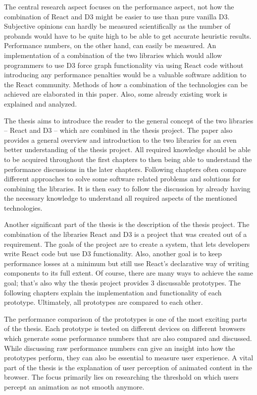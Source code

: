 The central research aspect focuses on the performance aspect, not how the combination of React and D3 might be easier to use than pure vanilla D3. Subjective opinions can hardly be measured scientifically as the number of probands would have to be quite high to be able to get accurate heuristic results. Performance numbers, on the other hand, can easily be measured. An implementation of a combination of the two libraries which would allow programmers to use D3 force graph functionality via using React code without introducing any performance penalties would be a valuable software addition to the React community. Methods of how a combination of the technologies can be achieved are elaborated in this paper. Also, some already existing work is explained and analyzed.

The thesis aims to introduce the reader to the general concept of the two libraries -- React and D3 -- which are combined in the thesis project. The paper also provides a general overview and introduction to the two libraries for an even better understanding of the thesis project. All required knowledge should be able to be acquired throughout the first chapters to then being able to understand the performance discussions in the later chapters. Following chapters often compare different approaches to solve some software related problems and solutions for combining the libraries. It is then easy to follow the discussion by already having the necessary knowledge to understand all required aspects of the mentioned technologies.

Another significant part of the thesis is the description of the thesis project. The combination of the libraries React and D3 is a project that was created out of a requirement. The goals of the project are to create a system, that lets developers write React code but use D3 functionality. Also, another goal is to keep performance losses at a minimum but still use React's declarative way of writing components to its full extent.  Of course, there are many ways to achieve the same goal; that's also why the thesis project provides 3 discussable prototypes. The following chapters explain the implementation and functionality of each prototype. Ultimately, all prototypes are compared to each other.

The performance comparison of the prototypes is one of the most exciting parts of the thesis. Each prototype is tested on different devices on different browsers which generate some performance numbers that are also compared and discussed. While discussing raw performance numbers can give an insight into how the prototypes perform, they can also be essential to measure user experience. A vital part of the thesis is the explanation of user perception of animated content in the browser. The focus primarily lies on researching the threshold on which users percept an animation as not smooth anymore.

